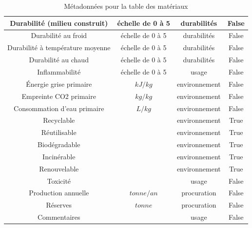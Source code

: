 \documentclass[12pt,a4paper]{article}
\begin{document}
\begin{table}
\begin{center}
\begin{tabular}{|c|c|c|c|}
                \hline
                Durabilité (milieu construit) & échelle de 0 à 5 & durabilités & False \\
                \hline
                Durabilité au froid & échelle de 0 à 5 & durabilités & False \\
                \hline
                Durabilité à température moyenne & échelle de 0 à 5 & durabilités & False \\
                \hline
                Durabilité au chaud & échelle de 0 à 5 & durabilités & False \\
                \hline
                Inflammabilité & échelle de 0 à 5 & usage & False \\
                \hline
                Énergie grise primaire & $kJ/kg$ & environnement & False \\
                \hline
                Empreinte CO2 primaire & $kg/kg$ & environnement & False \\
                \hline
                Consommation d'eau primaire & $L/kg$ & environnement & False \\
                \hline
                Recyclable &   & environnement & True \\
                \hline
                Réutilisable &   & environnement & True \\
                \hline
                Biodégradable &   & environnement & True \\
                \hline
                Incinérable &   & environnement & True \\
                \hline
                Renouvelable &   & environnement & True \\
                \hline
                Toxicité &   & usage & False \\
                \hline
                Production annuelle & $tonne/an$ & procuration & False \\
                \hline
                Réserves & $tonne$ & procuration & False \\
                \hline
                Commentaires &   & usage & False \\
                \hline
            \end{tabular}
        \end{center}
        \caption{Métadonnées pour la table des matériaux}
    \end{table}
\end{document}
